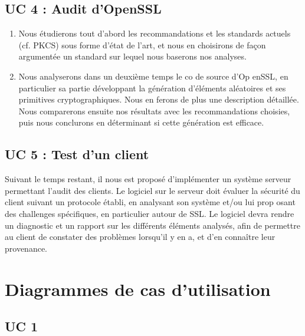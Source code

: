 \documentclass[a4paper,11pt,french]{article}
\begin{document}
\subsection{UC 4 : Audit d'OpenSSL}
\begin{enumerate}
 	\item Nous étudierons tout d'abord les recommandations et les standards actuels (cf. PKCS) sous forme d'état de l'art, et nous en choisirons de façon argumentée un standard sur lequel nous baserons nos analyses.
	\item Nous analyserons dans un deuxième temps le co de source d'Op enSSL, en particulier sa partie développant la génération d'éléments aléatoires et ses primitives cryptographiques. Nous en ferons de plus une description détaillée. Nous comparerons ensuite nos résultats avec les recommandations choisies, puis nous conclurons en déterminant si cette génération est efficace.
\end{enumerate}


\subsection{UC 5 : Test d'un client}
Suivant le temps restant, il nous est proposé d'implémenter un système serveur permettant l'audit des clients. Le logiciel sur le serveur doit évaluer la sécurité du client suivant un protocole établi, en analysant son système et/ou lui prop osant des challenges spécifiques, en particulier autour de SSL. Le logiciel devra rendre un diagnostic et un rapport sur les différents éléments analysés, afin de permettre au client de constater des problèmes lorsqu'il y en a, et d'en connaître leur provenance.

\section{Diagrammes de cas d'utilisation}

\subsection{UC 1}

\setlength{\fboxrule}{0.1mm}

\end{document}
